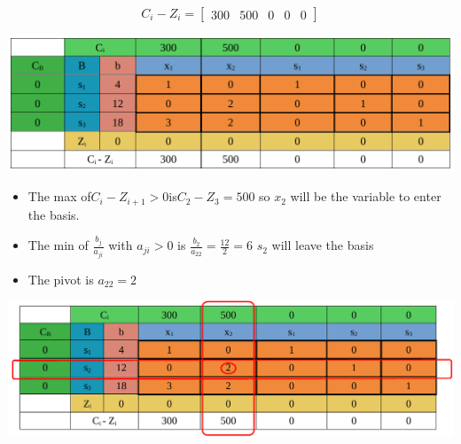 \[C_i-Z_i = \left[\begin{matrix} 300  & 500  & 0  & 0  & 0  \end{matrix}\right]\]

\vspace{0.35cm}

\begin{center}
    \includegraphics{Chapters/Simplexe/EX/EX1/ex1.1.pdf}
\end{center}

\vspace{0.25cm}

\begin{itemize}   
    \item The max of\hspace{0.2cm}\(C_i - Z_{i+1} > 0\)\hspace{0.2cm}is\hspace{0.2cm}\(C_2 - Z_3 = 500\)\hspace{0.1cm} so \(x_2\) 
will be the variable to enter the basis.
\item The min of \hspace{0.1cm}\(\frac{b_j}{a_{ji}}\)\hspace{0.1cm} with \(a_{ji} > 0\)\hspace{0.1cm} is \hspace{0.1cm} \(\frac{b_2}{a_{22}} = \frac{12}{2} = 6\)\hspace{0.35cm} \(s_2\)
will leave the basis
\item The pivot is \(a_{22} = 2\)
 
\end{itemize}

\vspace{0.25cm}
\begin{center}
    \includegraphics{Chapters/Simplexe/EX/EX1/ex1.2.pdf}
\end{center}

